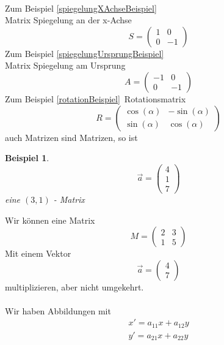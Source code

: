 \documentclass[a4paper,10pt]{report}
\newtheorem{myexample}{Beispiel}
\begin{document}
\\
Zum Beispiel \ref{spiegelungXAchseBeispiel}\\
Matrix Spiegelung an der x-Achse
\begin{equation*}
	S = \begin{pmatrix}1& 0 \\ 0 & -1\end{pmatrix}
\end{equation*}
Zum Beispiel \ref{spiegelungUrsprungBeispiel}\\
Matrix Spiegelung am Ursprung
\begin{equation*}
	A = \begin{pmatrix}-1& 0 \\ 0 & -1\end{pmatrix}
\end{equation*}
Zum Beispiel \ref{rotationBeispiel}\
Rotationsmatrix
\begin{equation*}
	R = \begin{pmatrix}\cos(\alpha)& -\sin(\alpha) \\ \sin(\alpha) & \cos(\alpha)\end{pmatrix}
\end{equation*}
auch Matrizen sind Matrizen, so ist 
\begin{myexample}
	\begin{equation*}
		\vec{a} = \begin{pmatrix}4\\1\\7\end{pmatrix}
	\end{equation*}
	eine $(3,1)$ - Matrix
\end{myexample}
\noindent
Wir können eine Matrix
\begin{equation*}
	M = \begin{pmatrix}2 & 3\\ 1 & 5\end{pmatrix}
\end{equation*}
Mit einem Vektor 
\begin{equation*}
	\vec{a} = \begin{pmatrix}4\\7\end{pmatrix}
\end{equation*}
multiplizieren, aber nicht umgekehrt.\\
\\
Wir haben Abbildungen mit
\begin{eqnarray*}
	x' = a_{11}x + a_{12}y\\
	y' = a_{21}x + a_{22}y
\end{eqnarray*}
\end{document}
